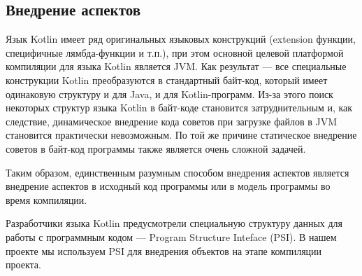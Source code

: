 \documentclass[conference]{IEEEtran}
\begin{document}

\subsection{Внедрение аспектов}

Язык Kotlin имеет ряд оригинальных языковых конструкций (extension функции,
специфичные лямбда-функции и т.п.), при этом основной целевой платформой
компиляции для языка Kotlin является JVM.
Как результат --- все специальные конструкции Kotlin преобразуются в стандартный
байт-код, который имеет одинаковую структуру и для Java, и для Kotlin-программ.
Из-за этого поиск некоторых структур языка Kotlin в байт-коде становится
затруднительным и, как следствие, динамическое внедрение кода советов при
загрузке файлов в JVM становится практически невозможным.
По той же причине статическое внедрение советов в байт-код программы также
является очень сложной задачей.

Таким образом, единственным разумным способом внедрения аспектов является
внедрение аспектов в исходный код программы или в модель программы во время
компиляции. 

Разработчики языка Kotlin предусмотрели специальную структуру данных для работы
с программным кодом --- Program Structure Inteface (PSI).
В нашем проекте мы используем PSI для внедрения объектов на этапе компиляции
проекта. 


\end{document}
